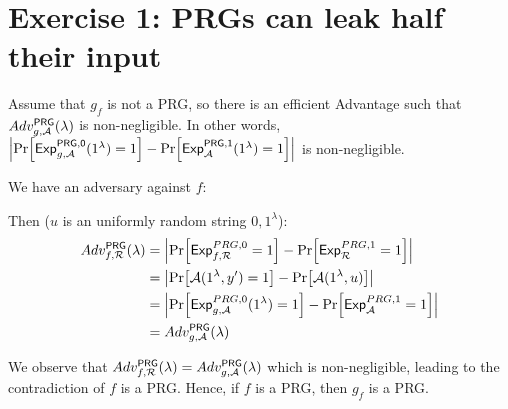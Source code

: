 \section{Exercise 1: PRGs can leak half their input}
Assume that \(g_f\) is not a PRG, so there is an efficient Advantage such that
\(Adv^{\mathsf{PRG}}_{g, \mathcal{A}}(\lambda)\) is non-negligible. In other words,
\(\left| \prob{\mathsf{Exp}_{g, \adv}^{\mathsf{PRG,0}}(1^\lambda) = 1} -
\prob{\mathsf{Exp}_{\adv}^{\mathsf{PRG,1}}(1^\lambda) = 1} \right|\) is non-negligible.

We have an adversary against \(f\):
\begin{center}
\end{center}

Then ($u$ is an uniformly random string ${0,1}^\lambda$):
\begin{align*}
    Adv^{\mathsf{PRG}}_{f,\rdv}(\lambda) &= \left| \prob{\mathsf{Exp}^{PRG, 0}_{f,\rdv} = 1} 
                                            - \prob{\mathsf{Exp}^{PRG, 1}_{\rdv} = 1}\right|\\
    &= \left| \prob{\adv(1^\lambda, y') = 1} - \prob{\adv(1^\lambda, u)} \right|\\
    &= \left| \prob{\mathsf{Exp}^{PRG, 0}_{g,\adv}(1^\lambda) = 1} - \prob{\mathsf{Exp}^{PRG, 1}_{\adv} = 1} \right|\\
    &= Adv^{\mathsf{PRG}}_{g, \adv}(\lambda)
\end{align*}

We observe that \(Adv^{\mathsf{PRG}}_{f,\mathcal{R}}(\lambda) = Adv^{\mathsf{PRG}}_{g, \mathcal{A}}(\lambda)\) which is
non-negligible, leading to the contradiction of \(f\) is a PRG. Hence, if \(f\) is a PRG, then \(g_f\) is
a PRG.